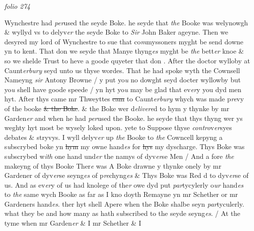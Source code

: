 \documentclass[12pt, a4paper]{book}
\begin{document}
\dotfill
						\newpage
{}

\textit{folio 274}



		\ifthenelse{\isodd{\thepage}}
		{\reversemarginpar}
		{\normalmarginpar}
		Wynchestre had \textit{per}used the seyde Boke. he seyde that \textit{the} Booke was welynowgh
\& wyllyd vs to delyv\textit{er} the seyde Boke 
			to \textit{Sir} John Baker ageyne. Then we desyred
my lord of Wynchestre to sue that co\textit{m}myssoners myght be send downe 
yn to kent. That don we seyde that Manye thyng\textit{es} myght be \textit{the} bett\textit{er} knoe
\& so we shelde Trust to heve a goode quyeter that don
			. After the doctor wylloby
at Caunt\textit{erbury} seyd unto us thyse wordes. That he had spoke wyth the Cownsell
Nameyng \textit{sir} Antony Browne / y put yo\textit{u} no dowght seyd docter wyllowby but 
			yo\textit{u} 
shell have goode speede / yn hyt yo\textit{u} may be glad that ev\textit{er}y you dyd men hyt.
	After thys came mr Thweyttes \sout{cam }to Caunt\textit{erbury} whych was made p\textit{re}vy of the booke
 	\sout{\& the Boke}. \& the Boke wer d\textit{elivere}d to hym y thynke by mr Garden\textit{er} and 
when he had \textit{per}used the Booke. he seyde that thys thyng wer ys weghty 
hyt most be wysely loked upon. yete to Suppose thyse \textit{contro}v\textit{er}syes debates \&
stryvys. I wyll delyv\textit{er} up \textit{the} Booke to \textit{the} Cowncell kepyng a s\textit{u}bscrybed boke
 	yn \sout{hym }
 	my 
			owne hand\textit{es} for \sout{hys }
               my
			 dyscharge. Thys Boke was s\textit{u}bscrybed w\textit{ith} one
hand und\textit{er} the namys of dyv\textit{er}se Men / And a fore \textit{the} makeyng of thys
Booke Ther\textit{e} was A Boke drawne y thynke onely by mr Gardener
of dyv\textit{er}se seyng\textit{es} of p\textit{re}chyng\textit{es} \& Thys Boke was Red d to dyv\textit{er}se of us. And
as ev\textit{er}y of us had knolege of the\textit{r} owe dyd put \textit{par}tycylerly o\textit{ur} hand\textit{es} to \textit{the} 
same wych Booke as far as I kno doyth Remayne yn mr Schether or mr
Gardeners hand\textit{es}. ther hyt shell Apere when the Boke shalbe seyn
\textit{par}tyculerly. what they be and how many as hath s\textit{u}bscribed to the seyde
seyng\textit{es}. / At the tyme when mr Garden\textit{er} \& I mr Schether \& I
\end{document}

